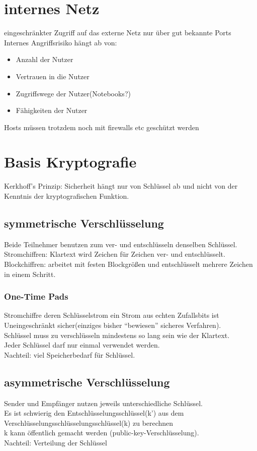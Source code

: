 \documentclass{article} %
\begin{document}
\section{internes Netz}
eingeschränkter Zugriff auf das externe Netz nur über gut bekannte Ports\\
Internes Angriffsrisiko hängt ab von:
\begin{itemize}
	\item Anzahl der Nutzer
    \item Vertrauen in die Nutzer
    \item Zugriffswege der Nutzer(Notebooks?)
    \item Fähigkeiten der Nutzer
\end{itemize}
Hosts müssen trotzdem noch mit firewalls etc geschützt werden
\section{Basis Kryptografie}
Kerkhoff's Prinzip: Sicherheit hängt nur von Schlüssel ab und nicht von der Kenntnis der kryptografischen Funktion.\\
\subsection{symmetrische Verschlüsselung}
Beide Teilnehmer benutzen zum ver- und entschlüsseln denselben Schlüssel.\\
Stromchiffren: Klartext wird Zeichen für Zeichen ver- und entschlüsselt.\\
Blockchiffren: arbeitet mit festen Blockgrößen und entschlüsselt mehrere Zeichen in einem Schritt.\\
\subsubsection{One-Time Pads}
Stromchiffre deren Schlüsselstrom ein Strom aus echten Zufallsbits ist\\
Uneingeschränkt sicher(einziges bisher "`bewiesen"' sicheres Verfahren).\\
Schlüssel muss zu verschlüsseln mindestens so lang sein wie der Klartext.\\
Jeder Schlüssel darf nur einmal verwendet werden.\\
Nachteil: viel Speicherbedarf für Schlüssel.\\
\subsection{asymmetrische Verschlüsselung}
Sender und Empfänger nutzen jeweils unterschiedliche Schlüssel.\\
Es ist schwierig den Entschlüsselungsschlüssel(k') aus dem Verschlüsselungsschlüsselungsschlüssel(k) zu berechnen\\
k kann öffentlich gemacht werden (public-key-Verschlüsselung).\\
Nachteil: Verteilung der Schlüssel\\
\end{document}

